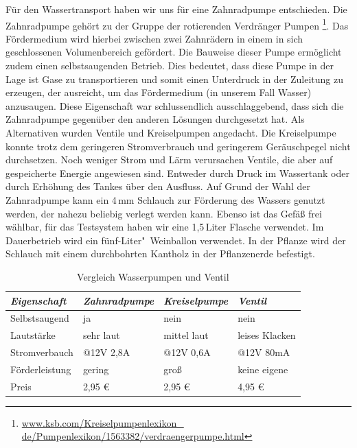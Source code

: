 Für den Wassertransport haben wir uns für eine Zahnradpumpe entschieden.
Die Zahnradpumpe gehört zu der Gruppe der rotierenden Verdränger Pumpen 
\footnote{\href{http://www.ksb.com/Kreiselpumpenlexikon\_de/Pumpenlexikon/1563382/verdraengerpumpe.html}{www.ksb.com/Kreiselpumpenlexikon\_ \\ de/Pumpenlexikon/1563382/verdraengerpumpe.html}}.
Das Fördermedium wird hierbei zwischen zwei Zahnrädern in einem in sich geschlossenen Volumenbereich gefördert.
Die Bauweise dieser Pumpe ermöglicht zudem einen selbstsaugenden Betrieb. 
Dies bedeutet, dass diese Pumpe in der Lage ist Gase zu transportieren und somit einen Unterdruck in der Zuleitung zu erzeugen, der ausreicht, um das Fördermedium (in unserem Fall Wasser) anzusaugen. 
Diese Eigenschaft war schlussendlich ausschlaggebend, dass sich die Zahnradpumpe gegenüber den anderen Lösungen durchgesetzt hat.
Als Alternativen wurden Ventile und Kreiselpumpen angedacht.
Die Kreiselpumpe konnte trotz dem geringeren Stromverbrauch und geringerem Geräuschpegel nicht durchsetzen. 
Noch weniger Strom und Lärm verursachen Ventile, die aber auf gespeicherte Energie angewiesen sind.  
Entweder durch Druck im Wassertank oder durch Erhöhung des Tankes über den Ausfluss. 
Auf Grund der Wahl der Zahnradpumpe kann ein 4\,mm Schlauch zur Förderung des Wassers genutzt werden, der nahezu beliebig verlegt werden kann.  
Ebenso ist das Gefäß frei wählbar, für das Testsystem haben wir eine 1,5\,Liter Flasche verwendet. Im Dauerbetrieb wird ein fünf-Liter"~Weinballon verwendet. 
In der Pflanze wird der Schlauch mit einem durchbohrten Kantholz in der Pflanzenerde befestigt.

	
\begin{table}
	\centering
		\onehalfspacing
	\footnotesize
	\caption{Vergleich Wasserpumpen und Ventil}
	\label{Vergleich zwischen Wasserpumpen und Ventil}
		\begin{tabular}{|l|lll|}
		\hline
		\textit{Eigenschaft} & \textit{Zahnradpumpe} & \textit{Kreiselpumpe} & \textit{Ventil} \\
		\hline
		Selbstsaugend	&ja	&nein &nein\\		
		Lautstärke		&sehr laut	&mittel laut	&leises Klacken\\
		Stromverbauch	&@12V 2,8A	&@12V 0,6A	&@12V 80mA\\
		Förderleistung	&gering		&groß		&keine eigene\\
		Preis			&2,95 \euro	& 2,95 \euro	&	4,95 \euro\\
		\hline		
		\end{tabular}
		
\end{table}	
	
